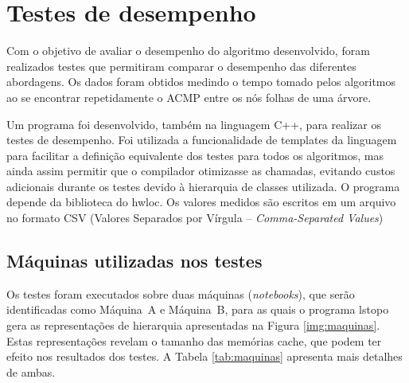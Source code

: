 
\chapter{Testes de desempenho}
\label{cap:testes}

Com o objetivo de avaliar o desempenho do algoritmo desenvolvido, foram realizados testes
que permitiram comparar o desempenho das diferentes abordagens.
Os dados foram obtidos medindo o tempo tomado pelos algoritmos
ao se encontrar repetidamente o ACMP entre os nós folhas de uma árvore.

Um programa foi desenvolvido, também na linguagem C++, para realizar os testes de desempenho.
Foi utilizada a funcionalidade de templates da linguagem para facilitar a definição equivalente dos testes para todos os algoritmos, mas ainda assim permitir que o compilador otimizasse as chamadas, evitando custos adicionais durante os testes devido à hierarquia de classes utilizada.
O programa depende da biblioteca do hwloc.
Os valores medidos são escritos em um arquivo no formato CSV (Valores Separados por Vírgula -- \textit{Comma-Separated Values})


\section{Máquinas utilizadas nos testes}

Os testes foram executados sobre duas máquinas (\textit{notebooks}), que serão identificadas como Máquina~A e Máquina~B, para as quais o programa lstopo gera as representações de hierarquia apresentadas na Figura \ref{img:maquinas}.
Estas representações revelam o tamanho das memórias cache, que podem ter efeito nos resultados dos testes.
A Tabela \ref{tab:maquinas} apresenta mais detalhes de ambas.




